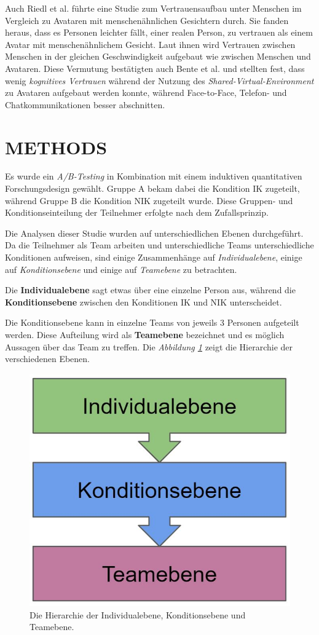 \documentclass[sigchi]{acmart}
\begin{document}
Auch Riedl et al. \citep{riedl2014trusting} führte eine Studie zum Vertrauensaufbau unter Menschen im Vergleich zu Avataren mit menschenähnlichen Gesichtern durch. Sie fanden heraus, dass es Personen leichter fällt, einer realen Person, zu vertrauen als einem Avatar mit menschenähnlichem Gesicht. Laut ihnen wird Vertrauen zwischen Menschen in der gleichen Geschwindigkeit aufgebaut wie zwischen Menschen und Avataren.
Diese Vermutung bestätigten auch Bente et al. \citep[S. 54-59]{bente2004social} und stellten fest, dass wenig \textit{kognitives Vertrauen} während der Nutzung des \textit{Shared-Virtual-Environment} zu Avataren aufgebaut werden konnte, während Face-to-Face, Telefon- und Chatkommunikationen besser abschnitten.

\section{METHODS}

Es wurde ein \textit{A/B-Testing} in Kombination mit einem induktiven quantitativen Forschungsdesign gewählt.
Gruppe A bekam dabei die Kondition IK zugeteilt, während Gruppe B die Kondition NIK zugeteilt wurde. Diese Gruppen- und Konditionseinteilung der Teilnehmer erfolgte nach dem Zufallsprinzip. 

Die Analysen dieser Studie wurden auf unterschiedlichen Ebenen durchgeführt.
Da die Teilnehmer als Team arbeiten und unterschiedliche Teams unterschiedliche Konditionen aufweisen, sind einige Zusammenhänge auf \textit{Individualebene}, einige auf \textit{Konditionsebene} und einige auf \textit{Teamebene} zu betrachten.

Die \textbf{Individualebene} sagt etwas über eine einzelne Person aus, während die \textbf{Konditionsebene} zwischen den Konditionen IK und NIK unterscheidet.

Die Konditionsebene kann in einzelne Teams von jeweils 3 Personen aufgeteilt werden. Diese Aufteilung wird als \textbf{Teamebene} bezeichnet und es möglich Aussagen über das Team zu treffen. 
Die \textit{Abbildung \ref{DifferentLevels}} zeigt die Hierarchie der verschiedenen Ebenen.

\begin{figure}[H]
		\begin{footnotesize}
		\centering
			\includegraphics[width=0.5\linewidth]{Abbildungen/DifferentLevels.JPG}	
			\caption[Die Hierarchieebenen]{Die Hierarchie der Individualebene, Konditionsebene und Teamebene.}
			\label{DifferentLevels}
		\end{footnotesize}
	\end{figure}
\end{document}
